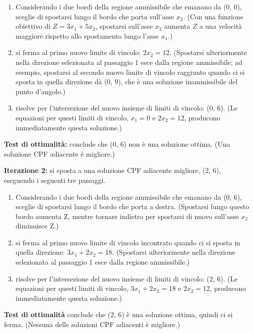 \documentclass[a4paper, 11pt]{article}
\begin{document}
        \begin{enumerate}
            \item Considerando i due bordi della regione ammissibile che emanano da (0, 0), sceglie di spostarsi lungo il bordo che porta sull'asse $x_2$. (Con una funzione obiettivo di $Z = 3x_1 + 5x_2$, spostarsi sull'asse $x_2$ aumenta $Z$ a una velocità maggiore rispetto allo spostamento lungo l'asse $x_1$.)
            \item si ferma al primo nuovo limite di vincolo: $2x_2 = 12$. (Spostarsi ulteriormente nella direzione selezionata al passaggio 1 esce dalla regione ammissibile; ad esempio, spostarsi al secondo nuovo limite di vincolo raggiunto quando ci si sposta in quella direzione dà (0, 9), che è una soluzione inammissibile del punto d'angolo.)
            \item risolve per l'intersezione del nuovo insieme di limiti di vincolo: (0, 6). (Le equazioni per questi limiti di vincolo, $x_1 = 0$ e $2x_2 = 12$, producono immediatamente questa soluzione.)
        \end{enumerate}

        \textbf{Test di ottimalità:} conclude che (0, 6) non è una soluzione ottima. (Una soluzione CPF adiacente è migliore.)

        \textbf{Iterazione 2:} si sposta a una soluzione CPF adiacente migliore, (2, 6), eseguendo i seguenti tre passaggi.

        \begin{enumerate}
            \item Considerando i due bordi della regione ammissibile che emanano da (0, 6), sceglie di spostarsi lungo il bordo che porta a destra. (Spostarsi lungo questo bordo aumenta Z, mentre tornare indietro per spostarsi di nuovo sull'asse $x_2$ diminuisce Z.)
            \item si ferma al primo nuovo limite di vincolo incontrato quando ci si sposta in quella direzione: $3x_1 + 2x_2 = 18$. (Spostarsi ulteriormente nella direzione selezionata al passaggio 1 esce dalla regione ammissibile.)
            \item risolve per l'intersezione del nuovo insieme di limiti di vincolo: (2, 6). (Le equazioni per questi limiti di vincolo, $3x_1 + 2x_2 = 18$ e $2x_2 = 12$, producono immediatamente questa soluzione.)
        \end{enumerate}

        \textbf{Test di ottimalità} conclude che (2, 6) è una soluzione ottima, quindi ci si ferma. (Nessuna delle soluzioni CPF adiacenti è migliore.)
\end{document}
